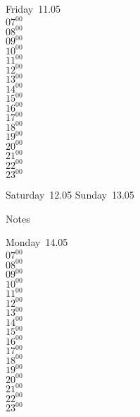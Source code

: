 \documentclass[11pt, a4paper]{book}\usepackage[]{graphicx}\usepackage[]{color}
\begin{document}
\begin{weekdaybox}
  Friday~11.05\\
  { 
  \vfill
  $07^{00}$\\
$08^{00}$\\
$09^{00}$\\
$10^{00}$\\
$11^{00}$\\
$12^{00}$\\
$13^{00}$\\
$14^{00}$\\
$15^{00}$\\
$16^{00}$\\
$17^{00}$\\
$18^{00}$\\
$19^{00}$\\
$20^{00}$\\
$21^{00}$\\
$22^{00}$\\
$23^{00}$\\
  }
\end{weekdaybox}
\begin{weekendbox}
  Saturday~12.05
  \tcblower
  Sunday~13.05
\end{weekendbox} %
\begin{notebox}
  Notes
\end{notebox}
\clearpage
\begin{headerbox}
\end{headerbox}
\begin{weekdaybox}
  Monday~14.05\\
  { 
  \vfill
  $07^{00}$\\
$08^{00}$\\
$09^{00}$\\
$10^{00}$\\
$11^{00}$\\
$12^{00}$\\
$13^{00}$\\
$14^{00}$\\
$15^{00}$\\
$16^{00}$\\
$17^{00}$\\
$18^{00}$\\
$19^{00}$\\
$20^{00}$\\
$21^{00}$\\
$22^{00}$\\
$23^{00}$\\
  }
\end{weekdaybox}
\end{document}
